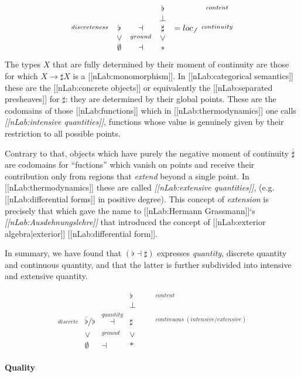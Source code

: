 \documentclass[12pt,titlepage]{article}
\newcommand{\itexarray}[1]{\begin{matrix}#1\end{matrix}}
\theoremstyle{plain}
\theoremstyle{definition}
\theoremstyle{remark}
\begin{document}
\begin{displaymath}
\itexarray{
     & && \flat && \stackrel{content}{}
     \\
     & && \bot &
     \\
     \stackrel{discreteness}{} & \flat &\dashv& \sharp & = loc_{\not \not}&  \stackrel{continuity}{}
     \\
     & \vee &\stackrel{ground}{}& \vee
     \\
     & \emptyset &\dashv& \ast &
  }
\end{displaymath}
The types $X$ that are fully determined by their moment of continuity are those for which $X \to \sharp X$ is a [[nLab:monomorphism]]. In [[nLab:categorical semantics]] these are the [[nLab:concrete objects]] or equivalently the [[nLab:separated presheaves]] for $\sharp$: they are determined by their global points. These are the codomains of those [[nLab:functions]] which in [[nLab:thermodynamics]] one calls \emph{[[nLab:intensive quantities]]}, functions whose value is genuinely given by their restriction to all possible points.

Contrary to that, objects which have purely the negative moment of continuity $\overline{\sharp}$ are codomains for ``fuctions'' which vanish on points and receive their contribution only from regions that \emph{extend} beyond a single point. In [[nLab:thermodynamics]] these are called \emph{[[nLab:extensive quantities]]}, (e.g. [[nLab:differential forms]] in positive degree). This concept of \emph{extension} is precisely that which gave the name to [[nLab:Hermann Grassmann]]`s \emph{[[nLab:Ausdehnungslehre]]} that introduced the concept of [[nLab:exterior algebra|exterior]] [[nLab:differential form]].

In summary, we have found that $(\flat \dashv \sharp)$ expresses \emph{quantity}, discrete quantity and continuous quantity, and that the latter is further subdivided into intensive and extensive quantity.

\begin{displaymath}
\itexarray{
     & && \flat & && \stackrel{content}{}
     \\
     & && \bot & &&
     \\
     \stackrel{discrete}{} & \overline{\flat}/\flat &\stackrel{quantity}{\dashv}& \sharp &  &   & \stackrel{continuous\; (intensive/extensive)}{}
     \\
     & \vee &\stackrel{ground}{}& \vee
     \\
     & \emptyset &\dashv& \ast &
  }
\end{displaymath}
\hypertarget{quality}{}\paragraph*{{Quality}}\label{quality}
\end{document}
